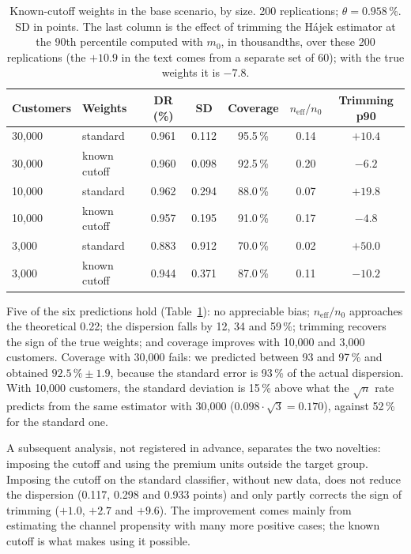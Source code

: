 \documentclass[twoside,11pt]{article}
\newcommand{\neff}{n_{\mathrm{eff}}}
\theoremstyle{plain}
\theoremstyle{definition}
\begin{document}
\begin{table}[ht]
\centering\small
\caption{Known-cutoff weights in the base scenario, by size. 200 replications; $\theta=0.958\,\%$. SD in points. The last column is the effect of trimming the Hájek estimator at the 90th percentile computed with $m_0$, in thousandths, over these 200 replications (the $+10.9$ in the text comes from a separate set of 60); with the true weights it is $-7.8$.}\label{tab:cutoff}
\begin{tabular}{@{}llccccc@{}}
\toprule
Customers & Weights & DR (\%) & SD & Coverage & $\neff/n_0$ & Trimming p90 \\
\midrule
30{,}000 & standard & 0.961 & 0.112 & 95.5\,\% & 0.14 & $+10.4$ \\
30{,}000 & known cutoff & 0.960 & 0.098 & 92.5\,\% & 0.20 & $-6.2$ \\
10{,}000 & standard & 0.962 & 0.294 & 88.0\,\% & 0.07 & $+19.8$ \\
10{,}000 & known cutoff & 0.957 & 0.195 & 91.0\,\% & 0.17 & $-4.8$ \\
3{,}000 & standard & 0.883 & 0.912 & 70.0\,\% & 0.02 & $+50.0$ \\
3{,}000 & known cutoff & 0.944 & 0.371 & 87.0\,\% & 0.11 & $-10.2$ \\
\bottomrule
\end{tabular}
\end{table}

Five of the six predictions hold (Table~\ref{tab:cutoff}): no appreciable bias; $\neff/n_0$ approaches the theoretical 0.22; the dispersion falls by 12, 34 and 59\,\%; trimming recovers the sign of the true weights; and coverage improves with 10{,}000 and 3{,}000 customers. Coverage with 30{,}000 fails: we predicted between 93 and 97\,\% and obtained $92.5\,\%\pm1.9$, because the standard error is 93\,\% of the actual dispersion. With 10{,}000 customers, the standard deviation is 15\,\% above what the $\sqrt n$ rate predicts from the same estimator with 30{,}000 ($0.098\cdot\sqrt3=0.170$), against 52\,\% for the standard one.

A subsequent analysis, not registered in advance, separates the two novelties: imposing the cutoff and using the premium units outside the target group. Imposing the cutoff on the standard classifier, without new data, does not reduce the dispersion (0.117, 0.298 and 0.933 points) and only partly corrects the sign of trimming ($+1.0$, $+2.7$ and $+9.6$). The improvement comes mainly from estimating the channel propensity with many more positive cases; the known cutoff is what makes using it possible.
\end{document}
